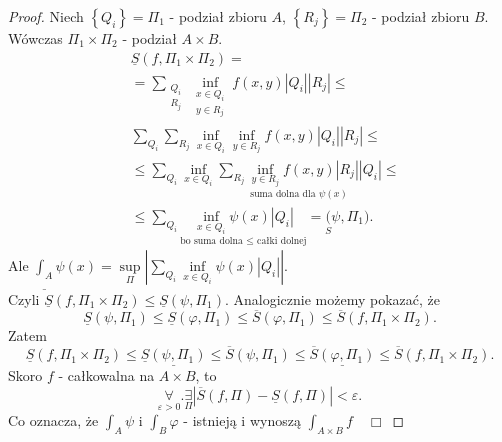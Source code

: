 \documentclass[../main.tex]{subfiles}
\begin{document}
    \begin{proof}
        Niech $\left\{ Q_i \right\} = \Pi_1$ - podział zbioru $A$, $\left\{ R_j \right\} = \Pi_2$ - podział zbioru $B$.\\
        Wówczas  $\Pi_1 \times \Pi_2$ - podział $A\times B$.
        \begin{align*}
            &\underline{S}(f,\Pi_1\times \Pi_2) = \\
            &= \sum_{\substack{Q_i\\ R_j}} \underset{\substack{x\in Q_i\\ y\in R_j}}{\inf} f(x,y) |Q_i| |R_j| \le\\
            &\sum_{Q_i}\sum_{R_j} \underset{x\in Q_i}{\inf} \underset{y\in R_j}{\inf} f(x,y) |Q_i| |R_j|\le\\
            &\le \sum_{Q_i}\underset{x\in Q_i}{\inf} \underset{\text{suma dolna dla $\psi(x)$}}{\sum_{R_j}\underset{y\in R_j}{\inf} f(x,y) |R_j| |Q_i|}\le\\
            &\le\sum_{Q_i}\underset{\text{bo suma dolna $\le$ całki dolnej}}{\underset{x\in Q_i}{\inf} \psi(x) |Q_i|} = \underset{S}(\psi,\Pi_1)
        .\end{align*}
        Ale $\underline{\int_A}\psi(x) = \underset{\Pi}{\sup} \left| \sum_{Q_i}\underset{x\in Q_i}{\inf} \psi(x) | Q_i | \right|$.\\
        Czyli $\underline{S}(f,\Pi_1\times\Pi_2) \le \underline{S}(\psi,\Pi_1)$. Analogicznie możemy pokazać, że\\
        \[\underline{S}(\psi,\Pi_1)\le\underline{S}(\varphi,\Pi_1)\le\overline{S}(\varphi,\Pi_1) \le\overline{S}(f,\Pi_1\times\Pi_2).\]
        Zatem
        \[
            \underline{S}(f,\Pi_1\times\Pi_2) \le \underline{\underline{S}(\psi,\Pi_1)} \le \overline{S}(\psi, \Pi_1) \le \underline{\overline{S}(\varphi,\Pi_1)} \le \overline{S}(f,\Pi_1\times\Pi_2)
        .\]
        Skoro $f$ - całkowalna na $A\times B$, to
    \[
        \underset{\varepsilon>0}{\forall} .\underset{\Pi}{\exists} |\overline{S}(f,\Pi) - \underline{S}(f,\Pi)|<\varepsilon
    .\]
    Co oznacza, że $\int_A \psi$ i $\int_B \varphi$ - istnieją i wynoszą $\int_{A\times B} f \quad\Box$

    \end{proof}
\end{document}
